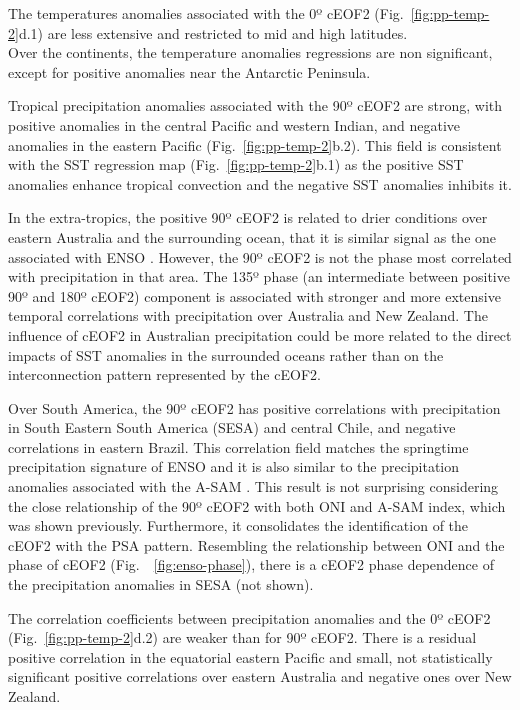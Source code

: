 \documentclass[pdflatex,lineno,sn-basic]{sn-jnl}
\theoremstyle{thmstyleone}%
\theoremstyle{thmstyletwo}%
\theoremstyle{thmstylethree}%
\begin{document}
The temperatures anomalies associated with the 0º cEOF2 (Fig.~\ref{fig:pp-temp-2}d.1) are less extensive and restricted to mid and high latitudes.\\
Over the continents, the temperature anomalies regressions are non significant, except for positive anomalies near the Antarctic Peninsula.

Tropical precipitation anomalies associated with the 90º cEOF2 are strong, with positive anomalies in the central Pacific and western Indian, and negative anomalies in the eastern Pacific (Fig.~\ref{fig:pp-temp-2}b.2).
This field is consistent with the SST regression map (Fig.~\ref{fig:pp-temp-2}b.1) as the positive SST anomalies enhance tropical convection and the negative SST anomalies inhibits it.

In the extra-tropics, the positive 90º cEOF2 is related to drier conditions over eastern Australia and the surrounding ocean, that it is similar signal as the one associated with ENSO \citep{cai2011}.
However, the 90º cEOF2 is not the phase most correlated with precipitation in that area.
The 135º phase (an intermediate between positive 90º and 180º cEOF2) component is associated with stronger and more extensive temporal correlations with precipitation over Australia and New Zealand.
The influence of cEOF2 in Australian precipitation could be more related to the direct impacts of SST anomalies in the surrounded oceans rather than on the interconnection pattern represented by the cEOF2.

Over South America, the 90º cEOF2 has positive correlations with precipitation in South Eastern South America (SESA) and central Chile, and negative correlations in eastern Brazil.
This correlation field matches the springtime precipitation signature of ENSO \citep[e.g.][]{cai2020a} and it is also similar to the precipitation anomalies associated with the A-SAM \citep{campitelli2022}.
This result is not surprising considering the close relationship of the 90º cEOF2 with both ONI and A-SAM index, which was shown previously.
Furthermore, it consolidates the identification of the cEOF2 with the PSA pattern. Resembling the relationship between ONI and the phase of cEOF2 (Fig.~~\ref{fig:enso-phase}), there is a cEOF2 phase dependence of the precipitation anomalies in SESA (not shown).

The correlation coefficients between precipitation anomalies and the 0º cEOF2 (Fig.~\ref{fig:pp-temp-2}d.2) are weaker than for 90º cEOF2.
There is a residual positive correlation in the equatorial eastern Pacific and small, not statistically significant positive correlations over eastern Australia and negative ones over New Zealand.
\end{document}

